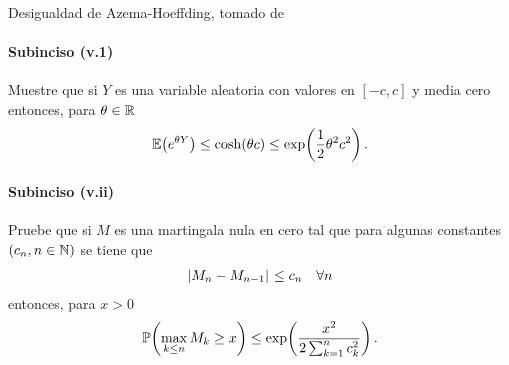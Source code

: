 Desigualdad de Azema-Hoeffding, tomado de \cite[E14.2, p.237]{MR1155402}
\paragraph{Subinciso (v.1)}
	 Muestre que si $Y$ es una variable aleatoria con valores en $[-c,c]$ y media cero entonces, para $\theta\in\mathbb{R}$
	\begin{align}
		\mathbb{E}\! \left( e^{\theta Y} \right)\leq\cosh\!\left( \theta c\right) \leq \exp\!\left( \frac{1}{2}\theta^2c^2\right) . 
	\end{align}
	\newpage

\paragraph{Subinciso (v.ii)} 
	Pruebe que si $M$ es una martingala nula en cero tal que para algunas constantes $\left( c_n,n\in\mathbb{N}\right) $ se tiene que
	\begin{align}
		\hspace{.25mm}\left|M_n-M_{n-1}\right|\hspace{.25mm}\leq c_n\quad\forall n
	\end{align}
	entonces, para $x>0$
	\begin{align}
		\mathbb{P}\! \left( \max_{k\leq n} M_k\geq x \right)\leq \exp\!\left( \frac{x^2}{2\sum_{k=1}^n c_k^2}\right) .
	\end{align}
